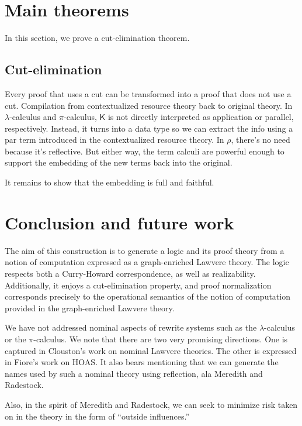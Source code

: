 \documentclass{llncs}
\renewcommand{\:}{\colon}
\newcommand{\pic}{$\pi$-calculus}
\begin{document}




\section{Main theorems}
In this section, we prove a cut-elimination theorem.
\subsection{Cut-elimination}
Every proof that uses a cut can be transformed into a proof that does
not use a cut.  Compilation from contextualized resource theory back
to original theory. In $\lambda$-calculus and {\pic}, $\mathsf{K}$ is
not directly interpreted as application or parallel,
respectively. Instead, it turns into a data type so we can extract the
info using a par term introduced in the contextualized resource
theory.  In $\rho$, there's no need because it's reflective.  But either
way, the term calculi are powerful enough to support the embedding of
the new terms back into the original.

It remains to show that the embedding is full and faithful.  

\section{Conclusion and future work}

The aim of this construction is to generate a logic and its proof
theory from a notion of computation expressed as a graph-enriched
Lawvere theory. The logic respects both a Curry-Howard correspondence,
as well as realizability. Additionally, it enjoys a cut-elimination
property, and proof normalization corresponds precisely to the
operational semantics of the notion of computation provided in the
graph-enriched Lawvere theory.

We have not addressed nominal aspects of rewrite systems such as the
$\lambda$-calculus or the {\pic}. We note that there are two very
promising directions. One is captured in Clouston’s work on nominal
Lawvere theories. The other is expressed in Fiore’s work on HOAS. It
also bears mentioning that we can generate the names used by such a
nominal theory using reflection, ala Meredith and Radestock.

Also, in the spirit of Meredith and Radestock, we can seek to minimize
risk taken on in the theory in the form of “outside influences.”




\end{document}
